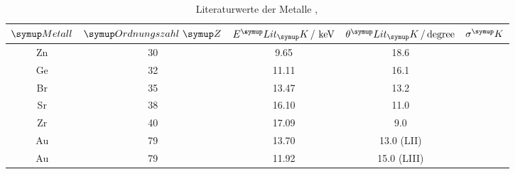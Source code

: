 \begin{table}
  \centering
  \begin{tabular}{c c c c c}
    \toprule
    $\su{Metall}$  & $\su{Ordnungszahl} \,\, \su{Z}$ &
    $E^\su{Lit}_\su{K} \,/\, \keV$ & $\theta^\su{Lit}_\su{K}\,/\,\si{degree}$ & $\sigma^\su{K}$ \\
    \midrule
     Zn & 30 & 9.65 & 18.6 &  \\
     Ge & 32 & 11.11 & 16.1 &  \\
     Br & 35 & 13.47 & 13.2 &  \\
     Sr & 38 & 16.10 & 11.0 &  \\
     Zr & 40 & 17.09 & 9.0 &  \\
     Au & 79 & 13.70 & 13.0 (LII) &  \\
     Au & 79 & 11.92 & 15.0 (LIII) &  \\
    \bottomrule
  \end{tabular}
  \caption{Literaturwerte der Metalle \cite{Elit},\,\cite{KAu}}
  \label{tab:info}
\end{table}

